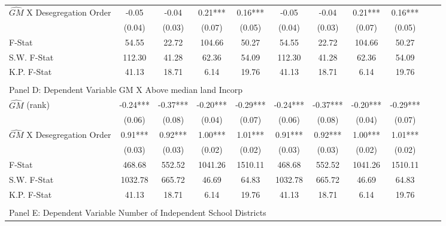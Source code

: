 \begin{table}[htbp]
\begin{threeparttable}
\begin{tabular}{l*{10}{c}}
\addlinespace
$\hat{GM}$ X Desegregation Order&      -0.05   &      -0.04   &       0.21***&       0.16***&      -0.05   &      -0.04   &       0.21***&       0.16***\\
                &     (0.04)   &     (0.03)   &     (0.07)   &     (0.05)   &     (0.04)   &     (0.03)   &     (0.07)   &     (0.05)   \\
\midrule
F-Stat          &      54.55   &      22.72   &     104.66   &      50.27   &      54.55   &      22.72   &     104.66   &      50.27   \\
S.W. F-Stat     &     112.30   &      41.28   &      62.36   &      54.09   &     112.30   &      41.28   &      62.36   &      54.09   \\
K.P. F-Stat     &      41.13   &      18.71   &       6.14   &      19.76   &      41.13   &      18.71   &       6.14   &      19.76   \\
\cmidrule[\heavyrulewidth](lr){1-9} \\ \cmidrule[\heavyrulewidth](lr){1-9}
\multicolumn{8}{l}{Panel D: Dependent Variable GM X Above median land Incorp}\\
\cmidrule(lr){1-9}
$\hat{GM}$ (rank)&      -0.24***&      -0.37***&      -0.20***&      -0.29***&      -0.24***&      -0.37***&      -0.20***&      -0.29***\\
                &     (0.06)   &     (0.08)   &     (0.04)   &     (0.07)   &     (0.06)   &     (0.08)   &     (0.04)   &     (0.07)   \\
\addlinespace
$\hat{GM}$ X Desegregation Order&       0.91***&       0.92***&       1.00***&       1.01***&       0.91***&       0.92***&       1.00***&       1.01***\\
                &     (0.03)   &     (0.03)   &     (0.02)   &     (0.02)   &     (0.03)   &     (0.03)   &     (0.02)   &     (0.02)   \\
\midrule
F-Stat          &     468.68   &     552.52   &    1041.26   &    1510.11   &     468.68   &     552.52   &    1041.26   &    1510.11   \\
S.W. F-Stat     &    1032.78   &     665.72   &      46.69   &      64.83   &    1032.78   &     665.72   &      46.69   &      64.83   \\
K.P. F-Stat     &      41.13   &      18.71   &       6.14   &      19.76   &      41.13   &      18.71   &       6.14   &      19.76   \\
\cmidrule[\heavyrulewidth](lr){1-9} \\ \cmidrule[\heavyrulewidth](lr){1-9}
\multicolumn{8}{l}{Panel E: Dependent Variable Number of Independent School Districts}\\

\end{tabular}
\end{threeparttable}
\end{table}
